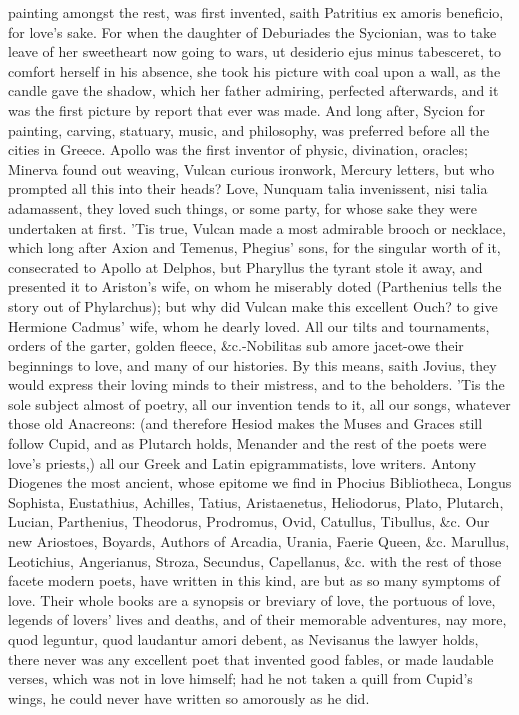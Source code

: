 {painting amongst the rest, was first invented, saith Patritius ex
amoris beneficio, for love's sake. For when the daughter of
Deburiades the Sycionian, was to take leave of her sweetheart now
going to wars, ut desiderio ejus minus tabesceret, to comfort herself
in his absence, she took his picture with coal upon a wall, as the
candle gave the shadow, which her father admiring, perfected
afterwards, and it was the first picture by report that ever was made.
And long after, Sycion for painting, carving, statuary, music, and
philosophy, was preferred before all the cities in Greece. Apollo
was the first inventor of physic, divination, oracles; Minerva found
out weaving, Vulcan curious ironwork, Mercury letters, but who prompted
all this into their heads? Love, Nunquam talia invenissent, nisi talia
adamassent, they loved such things, or some party, for whose sake they
were undertaken at first. 'Tis true, Vulcan made a most admirable
brooch or necklace, which long after Axion and Temenus, Phegius' sons,
for the singular worth of it, consecrated to Apollo at Delphos, but
Pharyllus the tyrant stole it away, and presented it to Ariston's wife,
on whom he miserably doted (Parthenius tells the story out of
Phylarchus); but why did Vulcan make this excellent Ouch? to give
Hermione Cadmus' wife, whom he dearly loved. All our tilts and
tournaments, orders of the garter, golden fleece, \&c.-Nobilitas sub
amore jacet-owe their beginnings to love, and many of our histories. By
this means, saith Jovius, they would express their loving minds to
their mistress, and to the beholders. 'Tis the sole subject almost of
poetry, all our invention tends to it, all our songs, whatever those
old Anacreons: (and therefore Hesiod makes the Muses and Graces still
follow Cupid, and as Plutarch holds, Menander and the rest of the poets
were love's priests,) all our Greek and Latin epigrammatists, love
writers. Antony Diogenes the most ancient, whose epitome we find in
Phocius Bibliotheca, Longus Sophista, Eustathius, Achilles, Tatius,
Aristaenetus, Heliodorus, Plato, Plutarch, Lucian, Parthenius,
Theodorus, Prodromus, Ovid, Catullus, Tibullus, \&c. Our new Ariostoes,
Boyards, Authors of Arcadia, Urania, Faerie Queen, \&c. Marullus,
Leotichius, Angerianus, Stroza, Secundus, Capellanus, \&c. with the rest
of those facete modern poets, have written in this kind, are but as so
many symptoms of love. Their whole books are a synopsis or breviary of
love, the portuous of love, legends of lovers' lives and deaths, and of
their memorable adventures, nay more, quod leguntur, quod laudantur
amori debent, as Nevisanus the lawyer holds, there never was any
excellent poet that invented good fables, or made laudable verses,
which was not in love himself; had he not taken a quill from Cupid's
wings, he could never have written so amorously as he did.

}
